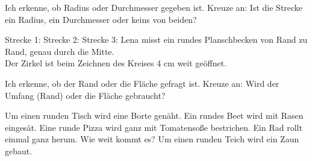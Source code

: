 \setcounter{aufgabe}{9}

\begin{aufgabe}{Ich erkenne, ob Radius oder Durchmesser gegeben ist.}
Kreuze an: Ist die Strecke ein Radius, ein Durchmesser oder keins von beiden?

\begin{kreis}[1.8]
\end{kreis}

\begin{teile}
\teil Strecke 1: \quad {}
\teil Strecke 2: \quad {}
\teil Strecke 3: \quad {}
\teil Lena misst ein rundes Planschbecken von Rand zu Rand, genau durch die Mitte. \\
\teil Der Zirkel ist beim Zeichnen des Kreises 4 cm weit geöffnet. \\
\end{teile}
\end{aufgabe}

\begin{aufgabe}{Ich erkenne, ob der Rand oder die Fläche gefragt ist.}
Kreuze an: Wird der Umfang (Rand) oder die Fläche gebraucht?
\begin{teile}
\teil Um einen runden Tisch wird eine Borte genäht. \hfill {}
\teil Ein rundes Beet wird mit Rasen eingesät. \hfill {}
\teil Eine runde Pizza wird ganz mit Tomatensoße bestrichen. \hfill {}
\teil Ein Rad rollt einmal ganz herum. Wie weit kommt es? \hfill {}
\teil Um einen runden Teich wird ein Zaun gebaut. \hfill {}
\end{teile}
\end{aufgabe}

